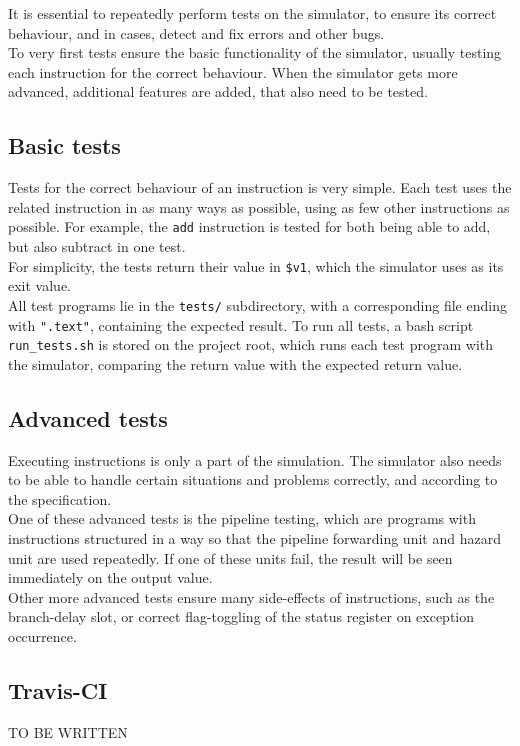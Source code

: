 It is essential to repeatedly perform tests on the simulator, to ensure its
correct behaviour, and in cases, detect and fix errors and other bugs.\\
To very first tests ensure the basic functionality of the simulator, usually
testing each instruction for the correct behaviour. When the simulator gets more
advanced, additional features are added, that also need to be tested.

\subsection{Basic tests}
Tests for the correct behaviour of an instruction is very simple. Each test uses
the related instruction in as many ways as possible, using as few other
instructions as possible. For example, the \texttt{add} instruction is tested
for both being able to add, but also subtract in one test.\\
For simplicity, the tests return their value in \texttt{\$v1}, which the
simulator uses as its exit value.\\
All test programs lie in the \texttt{tests/} subdirectory, with a corresponding
file ending with \texttt{".text"}, containing the expected result.
To run all tests, a bash script \texttt{run\_tests.sh} is stored on the project
root, which runs each test program with the simulator, comparing the return
value with the expected return value.

\subsection{Advanced tests}
Executing instructions is only a part of the simulation. The simulator also
needs to be able to handle certain situations and problems correctly, and
according to the specification.\\
One of these advanced tests is the pipeline testing, which are programs
with instructions structured in a way so that the pipeline forwarding unit and
hazard unit are used repeatedly. If one of these units fail, the result will be
seen immediately on the output value.\\
Other more advanced tests ensure many side-effects of instructions, such as the
branch-delay slot, or correct flag-toggling of the status register on exception
occurrence.

\subsection{Travis-CI}
TO BE WRITTEN

